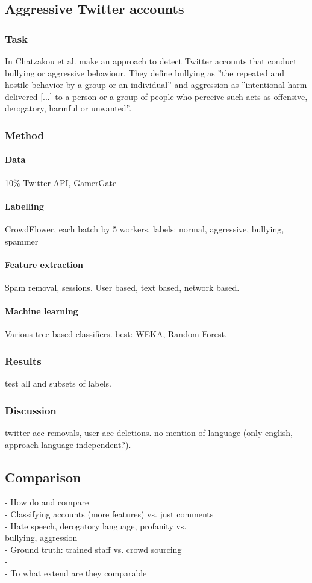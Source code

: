 \documentclass{proseminar}
\begin{document}
\subsection{Aggressive Twitter accounts}
\subsubsection{Task}
In \cite{Twitter:2017} Chatzakou et al. make an approach to detect Twitter accounts that conduct bullying or aggressive behaviour. They define bullying as ''the repeated and hostile behavior by a group or an individual'' and aggression as ''intentional harm delivered [...] to a person or a group of people who perceive such acts as offensive, derogatory, harmful or unwanted''.

\subsubsection{Method}
\paragraph{Data} 10\% Twitter API, GamerGate
\paragraph{Labelling} CrowdFlower, each batch by 5 workers, labels: normal, aggressive, bullying, spammer
\paragraph{Feature extraction} Spam removal, sessions. User based, text based, network based.
\paragraph{Machine learning} Various tree based classifiers. best: WEKA, Random Forest.
\subsubsection{Results} test all and subsets of labels.
\subsubsection{Discussion} twitter acc removals, user acc deletions. no mention of language (only english, approach language independent?).

\subsection{Comparison}
- How do \cite{Yahoo:2016} and \cite{Twitter:2017} compare\\
\hphantom{- }- Classifying accounts (more features) vs. just comments\\
\hphantom{- }- Hate speech, derogatory language, profanity vs.\\
\hphantom{- - }bullying, aggression\\
\hphantom{- }- Ground truth: trained staff vs. crowd sourcing\\
\hphantom{- }- \\
- To what extend are they comparable
\end{document}
